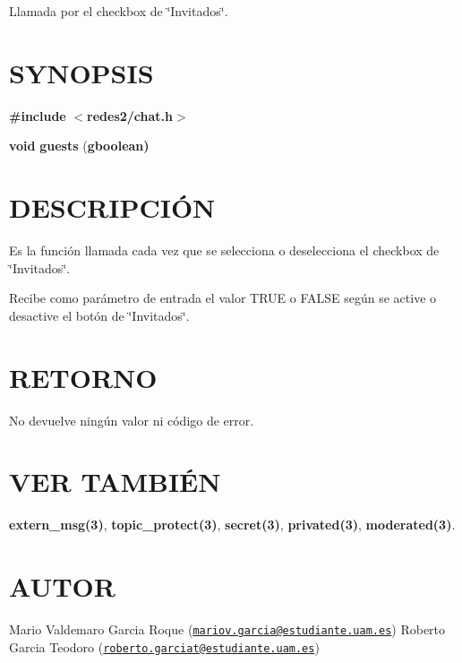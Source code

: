 Llamada por el checkbox de \char`\"{}\-Invitados\char`\"{}.\hypertarget{getTamanoFichero_SYNOPSIS}{}\section{S\-Y\-N\-O\-P\-S\-I\-S}\label{getTamanoFichero_SYNOPSIS}
{\bfseries \#include} {\bfseries $<$redes2/chat.\-h$>$} 

{\bfseries void} {\bfseries guests} {\bfseries }({\bfseries gboolean{\bfseries })} \hypertarget{getTamanoFichero_descripcion}{}\section{D\-E\-S\-C\-R\-I\-P\-C\-IÓ\-N}\label{getTamanoFichero_descripcion}
Es la función llamada cada vez que se selecciona o deselecciona el checkbox de \char`\"{}\-Invitados\char`\"{}.

Recibe como parámetro de entrada el valor T\-R\-U\-E o F\-A\-L\-S\-E según se active o desactive el botón de \char`\"{}\-Invitados\char`\"{}.\hypertarget{getTamanoFichero_retorno}{}\section{R\-E\-T\-O\-R\-N\-O}\label{getTamanoFichero_retorno}
No devuelve ningún valor ni código de error.\hypertarget{servidorArchivo_seealso}{}\section{V\-E\-R T\-A\-M\-B\-IÉ\-N}\label{servidorArchivo_seealso}
{\bfseries extern\-\_\-msg(3)}, {\bfseries topic\-\_\-protect(3)}, {\bfseries secret(3)}, {\bfseries privated(3)}, {\bfseries moderated(3)}.\hypertarget{getTamanoFichero_authors}{}\section{A\-U\-T\-O\-R}\label{getTamanoFichero_authors}
Mario Valdemaro Garcia Roque (\href{mailto:mariov.garcia@estudiante.uam.es}{\tt mariov.\-garcia@estudiante.\-uam.\-es}) Roberto Garcia Teodoro (\href{mailto:roberto.garciat@estudiante.uam.es}{\tt roberto.\-garciat@estudiante.\-uam.\-es}) 